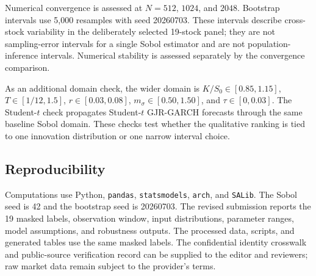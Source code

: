 Numerical convergence is assessed at $N=512$, $1024$, and $2048$. Bootstrap intervals use 5,000 resamples with seed 20260703. These intervals describe cross-stock variability in the deliberately selected 19-stock panel; they are not sampling-error intervals for a single Sobol estimator and are not population-inference intervals. Numerical stability is assessed separately by the convergence comparison.

As an additional domain check, the wider domain is $K/S_0\in[0.85,1.15]$, $T\in[1/12,1.5]$, $r\in[0.03,0.08]$, $m_\sigma\in[0.50,1.50]$, and $\tau\in[0,0.03]$. The Student-$t$ check propagates Student-$t$ GJR-GARCH forecasts through the same baseline Sobol domain. These checks test whether the qualitative ranking is tied to one innovation distribution or one narrow interval choice.

\subsection{Reproducibility}
\label{subsec:computational-procedure}

Computations use Python, \texttt{pandas}, \texttt{statsmodels}, \texttt{arch}, and \texttt{SALib}. The Sobol seed is 42 and the bootstrap seed is 20260703. The revised submission reports the 19 masked labels, observation window, input distributions, parameter ranges, model assumptions, and robustness outputs. The processed data, scripts, and generated tables use the same masked labels. The confidential identity crosswalk and public-source verification record can be supplied to the editor and reviewers; raw market data remain subject to the provider's terms.

